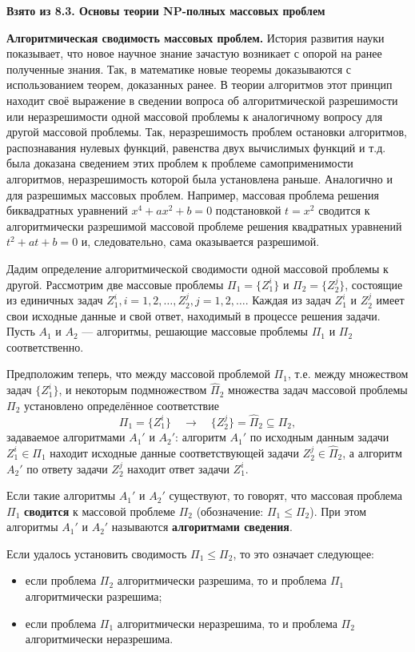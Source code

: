\documentclass[a4paper,12pt]{article}
\begin{document}
\textbf{Взято из 8.3. Основы теории NP-полных массовых проблем}

\textbf{Алгоритмическая сводимость массовых проблем.} История развития науки показывает, что новое научное знание зачастую возникает с опорой на ранее полученные знания. Так, в математике новые теоремы доказываются с использованием теорем, доказанных ранее. В теории алгоритмов этот принцип находит своё выражение в сведении вопроса об алгоритмической разрешимости или неразрешимости одной массовой проблемы к аналогичному вопросу для другой массовой проблемы. Так, неразрешимость проблем остановки алгоритмов, распознавания нулевых функций, равенства двух вычислимых функций и т.д. была доказана сведением этих проблем к проблеме самоприменимости алгоритмов, неразрешимость которой была установлена раньше. Аналогично и для разрешимых массовых проблем. Например, массовая проблема решения биквадратных уравнений \(x^4 + ax^2 + b = 0\) подстановкой \(t = x^2\) сводится к алгоритмически разрешимой массовой проблеме решения квадратных уравнений \(t^2 + at + b = 0\) и, следовательно, сама оказывается разрешимой.

Дадим определение алгоритмической сводимости одной массовой проблемы к другой. Рассмотрим две массовые проблемы \(\Pi_1 = \{Z_1^i\}\) и \(\Pi_2 = \{Z_2^j\}\), состоящие из единичных задач \(Z_1^i, i = 1, 2, \dots, Z_2^j, j = 1, 2, \dots\). Каждая из задач \(Z_1^i\) и \(Z_2^j\) имеет свои исходные данные и свой ответ, находимый в процессе решения задачи. Пусть \(A_1\) и \(A_2\) --- алгоритмы, решающие массовые проблемы \(\Pi_1\) и \(\Pi_2\) соответственно.

Предположим теперь, что между массовой проблемой \(\Pi_1\), т.е. между множеством задач \(\{Z_1^i\}\), и некоторым подмножеством \(\hat{\Pi}_2\) множества задач массовой проблемы \(\Pi_2\) установлено определённое соответствие
\[
\Pi_1 = \{Z_1^i\} \quad \longrightarrow \quad \{Z_2^j\} = \hat{\Pi}_2 \subseteq \Pi_2,
\]
задаваемое алгоритмами \(A_1'\) и \(A_2'\): алгоритм \(A_1'\) по исходным данным задачи \(Z_1^i \in \Pi_1\) находит исходные данные соответствующей задачи \(Z_2^j \in \hat{\Pi}_2\), а алгоритм \(A_2'\) по ответу задачи \(Z_2^j\) находит ответ задачи \(Z_1^i\).

Если такие алгоритмы \(A_1'\) и \(A_2'\) существуют, то говорят, что массовая проблема \(\Pi_1\) \textbf{сводится} к массовой проблеме \(\Pi_2\) (обозначение: \(\Pi_1 \le \Pi_2\)). При этом алгоритмы \(A_1'\) и \(A_2'\) называются \textbf{алгоритмами сведения}.

Если удалось установить сводимость \(\Pi_1 \le \Pi_2\), то это означает следующее:
\begin{itemize}
    \item если проблема \(\Pi_2\) алгоритмически разрешима, то и проблема \(\Pi_1\) алгоритмически разрешима;
    \item если проблема \(\Pi_1\) алгоритмически неразрешима, то и проблема \(\Pi_2\) алгоритмически неразрешима.
\end{itemize}
\end{document}
